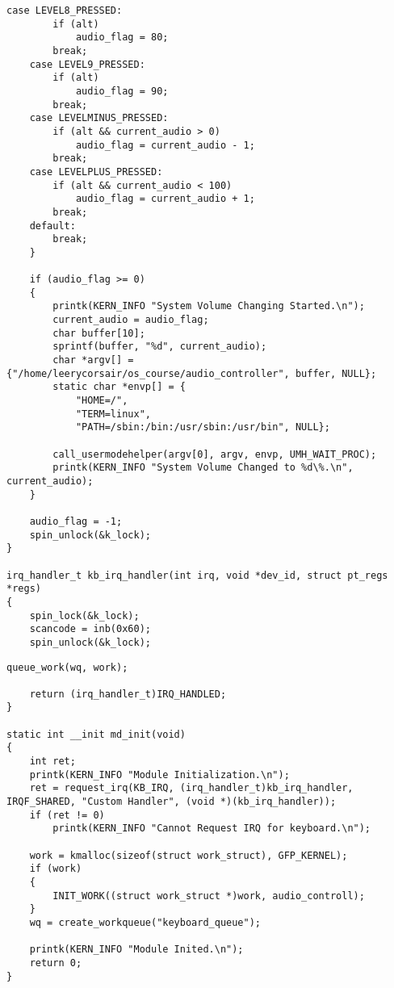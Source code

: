 \begin{appendices}
\clearpage

\begin{lstlisting}[caption={Листинг audio\_module.c(часть 3)}]
    case LEVEL8_PRESSED:
        if (alt)
            audio_flag = 80;
        break;
    case LEVEL9_PRESSED:
        if (alt)
            audio_flag = 90;
        break;
    case LEVELMINUS_PRESSED:
        if (alt && current_audio > 0)
            audio_flag = current_audio - 1;
        break;
    case LEVELPLUS_PRESSED:
        if (alt && current_audio < 100)
            audio_flag = current_audio + 1;
        break;
    default:
        break;
    }

    if (audio_flag >= 0)
    {
        printk(KERN_INFO "System Volume Changing Started.\n");
        current_audio = audio_flag;
        char buffer[10];
        sprintf(buffer, "%d", current_audio);
        char *argv[] = {"/home/leerycorsair/os_course/audio_controller", buffer, NULL};
        static char *envp[] = {
            "HOME=/",
            "TERM=linux",
            "PATH=/sbin:/bin:/usr/sbin:/usr/bin", NULL};

        call_usermodehelper(argv[0], argv, envp, UMH_WAIT_PROC);
        printk(KERN_INFO "System Volume Changed to %d\%.\n", current_audio);
    }

    audio_flag = -1;
    spin_unlock(&k_lock);
}

irq_handler_t kb_irq_handler(int irq, void *dev_id, struct pt_regs *regs)
{
    spin_lock(&k_lock);
    scancode = inb(0x60);
    spin_unlock(&k_lock);
\end{lstlisting}

\clearpage

\begin{lstlisting}[caption={Листинг audio\_module.c(часть 4)}]
    queue_work(wq, work);

    return (irq_handler_t)IRQ_HANDLED;
}

static int __init md_init(void)
{
    int ret;
    printk(KERN_INFO "Module Initialization.\n");
    ret = request_irq(KB_IRQ, (irq_handler_t)kb_irq_handler, IRQF_SHARED, "Custom Handler", (void *)(kb_irq_handler));
    if (ret != 0)
        printk(KERN_INFO "Cannot Request IRQ for keyboard.\n");

    work = kmalloc(sizeof(struct work_struct), GFP_KERNEL);
    if (work)
    {
        INIT_WORK((struct work_struct *)work, audio_controll);
    }
    wq = create_workqueue("keyboard_queue");

    printk(KERN_INFO "Module Inited.\n");
    return 0;
}


\end{lstlisting}
\end{appendices}
